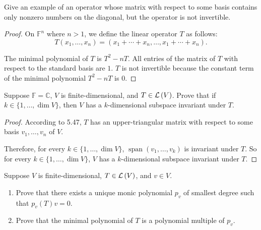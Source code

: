 \begin{exercise}
    Give an example of an operator whose matrix with respect to some basis contains only nonzero numbers on the diagonal, but the operator is not invertible.
\end{exercise}

\begin{proof}
    On $\mathbb{F}^{n}$ where $n > 1$, we define the linear operator $T$ as follows:
    \[
        T(x_{1}, \ldots, x_{n}) = (x_{1} + \cdots + x_{n}, \ldots, x_{1} + \cdots + x_{n}).
    \]

    The minimal polynomial of $T$ is $T^{2} - nT$. All entries of the matrix of $T$ with respect to the standard basis are $1$. $T$ is not invertible because the constant term of the minimal polynomial $T^{2} - nT$ is $0$.
\end{proof}
\newpage

\begin{exercise}
    Suppose $\mathbb{F} = \mathbb{C}$, $V$ is finite-dimensional, and $T \in \mathcal{L}\left({V}\right)$. Prove that if $k \in \{1, \ldots, \dim V\}$, then $V$ has a $k$-dimensional subspace invariant under $T$.
\end{exercise}

\begin{proof}
    According to 5.47, $T$ has an upper-triangular matrix with respect to some basis $v_{1}, \ldots, v_{n}$ of $V$.

    Therefore, for every $k \in \{1, \ldots, \dim V\}$, $\operatorname{span}(v_{1}, \ldots, v_{k})$ is invariant under $T$. So for every $k \in \{1, \ldots, \dim V\}$, $V$ has a $k$-dimensional subspace invariant under $T$.
\end{proof}
\newpage

\begin{exercise}
    Suppose $V$ is finite-dimensional, $T\in\mathcal{L}\left({V}\right)$, and $v\in V$.
    \begin{enumerate}[label={(\alph*)}]
        \item Prove that there exists a unique monic polynomial $p_{v}$ of smallest degree such that $p_{v}(T)v = 0$.
        \item Prove that the minimal polynomial of $T$ is a polynomial multiple of $p_{v}$.
    \end{enumerate}
\end{exercise}

